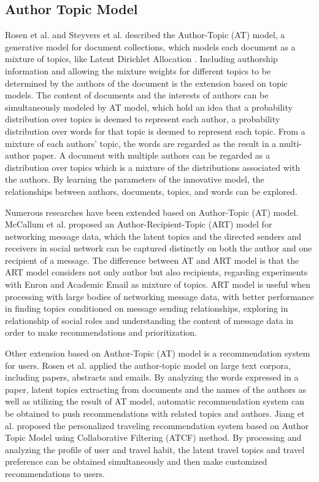 \subsection{Author Topic Model}\label{2at}

Rosen et al. \cite{rosen2004author} and Steyvers et al. \cite{steyvers2004probabilistic} described the Author-Topic (AT) model, a generative model for document collections, which models each document as a mixture of topics, like Latent Dirichlet Allocation \cite{blei2003latent}. Including authorship information and allowing the mixture weights for different topics to be determined by the authors of the document is the extension based on topic models. The content of documents and the interests of authors can be simultaneously modeled by AT model, which hold an idea that a probability distribution over topics is deemed to represent each author,  a probability distribution over words for that topic is deemed to represent each topic. From a mixture of each authors’ topic, the words are regarded as the result in a multi-author paper. A document with multiple authors can be regarded as a distribution over topics which is a mixture of the distributions associated with the authors. By learning the parameters of the innovative model, the relationships between authors, documents, topics, and words can be explored.

Numerous researches have been extended based on Author-Topic (AT) model. McCallum et al. \cite{mccallum2005author} proposed an Author-Recipient-Topic (ART) model for networking message data, which the latent topics and the directed senders and receivers in social network can be captured  distinctly on both the author and one recipient of a message. The difference between AT and ART model is that the ART model considers not only author but also recipients, regarding experiments with Enron and Academic Email as mixture of topics. ART model is useful when processing with large bodies of networking message data, with better performance in finding topics conditioned on message sending relationships,  exploring in relationship of social roles and understanding the content of message data in order to make recommendations and prioritization.

Other extension based on Author-Topic (AT) model is a recommendation system for users. Rosen et al. \cite{rosen2010learning} applied the author-topic model on large text corpora, including papers, abstracts and emails. By analyzing the words expressed in a paper, latent topics extracting from documents and the names of the authors as well as utilizing the result of AT model, automatic recommendation system can be obtained to push recommendations with related topics and authors. Jiang et al. \cite{jiang2015author} proposed the personalized traveling recommendation system based on Author Topic Model using Collaborative Filtering (ATCF) method. By processing and analyzing the profile of user and travel habit, the latent travel topics and travel preference can be obtained simultaneously and then make customized recommendations to users.

